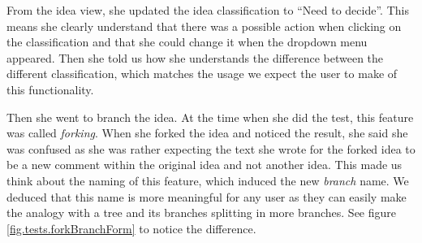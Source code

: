 \documentclass[a4paper,12pt, oneside]{article}
\begin{document}
From the idea view, she updated the idea classification to “Need to decide”.
This means she clearly understand that there was a possible action when clicking on the classification and that she could change it when the dropdown menu appeared.
Then she told us how she understands the difference between the different classification, which matches the usage we expect the user to make of this functionality.

Then she went to branch the idea.
At the time when she did the test, this feature was called \emph{forking}.
When she forked the idea and noticed the result, she said she was confused as she was rather expecting the text she wrote for the forked idea to be a new comment within the original idea and not another idea.
This made us think about the naming of this feature, which induced the new \emph{branch} name.
We deduced that this name is more meaningful for any user as they can easily make the analogy with a tree and its branches splitting in more branches.
See figure \ref{fig.tests.forkBranchForm} to notice the difference.
\end{document}
